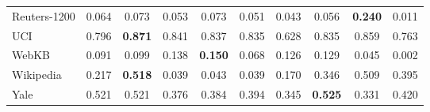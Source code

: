 \begin{table}[H]
\begin{tabular}{l c c c c c c c c c}
Reuters-1200 & 0.064 & 0.073 & 0.053 & 0.073 & 0.051 & 0.043 & 0.056 & \textbf{0.240} & 0.011\\
UCI & 0.796 & \textbf{0.871} & 0.841 & 0.837 & 0.835 & 0.628 & 0.835 & 0.859 & 0.763\\
WebKB & 0.091 & 0.099 & 0.138 & \textbf{0.150} & 0.068 & 0.126 & 0.129 & 0.045 & 0.002\\
Wikipedia & 0.217 & \textbf{0.518} & 0.039 & 0.043 & 0.039 & 0.170 & 0.346 & 0.509 & 0.395\\
Yale & 0.521 & 0.521 & 0.376 & 0.384 & 0.394 & 0.345 & \textbf{0.525} & 0.331 & 0.420\\
\bottomrule
\end{tabular}
\end{table}
